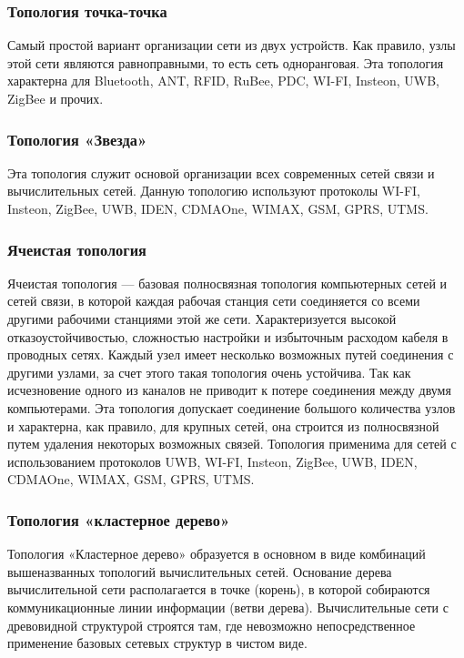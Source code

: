 \documentclass[a4paper,12pt]{article}
\begin{document}
\subsubsection{Топология точка-точка}
Самый простой вариант организации сети из двух устройств. Как правило, узлы этой сети являются равноправными, то есть сеть одноранговая.
Эта топология характерна для Bluetooth, ANT, RFID, RuBee, PDC, WI-FI, Insteon, UWB, ZigBee и прочих.

\subsubsection{Топология «Звезда»}
Эта топология служит основой организации всех современных сетей связи и вычислительных сетей. Данную топологию используют протоколы WI-FI, Insteon, ZigBee, UWB, IDEN, CDMAOne, WIMAX, GSM, GPRS, UTMS.

\subsubsection{Ячеистая топология}
Ячеистая топология — базовая полносвязная топология компьютерных сетей и сетей связи, в которой каждая рабочая станция сети соединяется со всеми другими рабочими станциями этой же сети. Характеризуется высокой отказоустойчивостью, сложностью настройки и избыточным расходом кабеля в проводных сетях. Каждый узел имеет несколько возможных путей соединения с другими узлами, за счет этого такая топология очень устойчива. Так как исчезновение одного из каналов не приводит к потере соединения между двумя компьютерами. Эта топология допускает соединение большого количества узлов и характерна, как правило, для крупных сетей, она строится из полносвязной путем удаления некоторых возможных связей.
Топология применима для сетей с использованием протоколов UWB, WI-FI, Insteon, ZigBee, UWB, IDEN, CDMAOne, WIMAX, GSM, GPRS, UTMS.

\subsubsection{Топология «кластерное дерево»}
Топология «Кластерное дерево» образуется в основном в виде комбинаций вышеназванных топологий вычислительных сетей. Основание дерева вычислительной сети располагается в точке (корень), в которой собираются коммуникационные линии информации (ветви дерева).
Вычислительные сети с древовидной структурой строятся там, где невозможно непосредственное применение базовых сетевых структур в чистом виде.
\end{document}
